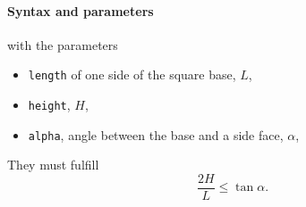 \begin{figure}[h]
\hfill
{}
\hfill
{}
\hfill
{}
\hfill
\end{figure}

\FloatBarrier

\paragraph{Syntax and parameters}
\begin{quote}
\end{quote}
with the parameters
\begin{itemize}
\item \texttt{length} of one side of the square base, $L$,  
\item \texttt{height}, $H$,
\item \texttt{alpha}, angle between the base and a side face, $\alpha$,
\end{itemize}
They must fulfill
\begin{displaymath}
  \dfrac{2H}{L} \le \tan\alpha.
\end{displaymath}


